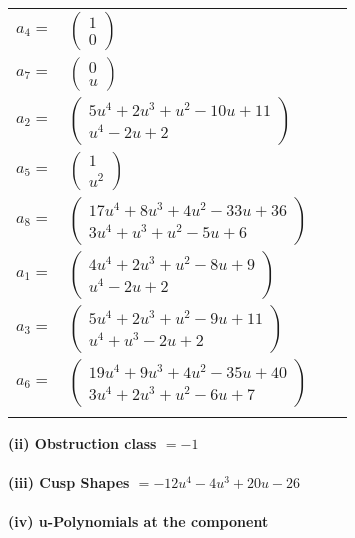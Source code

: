 \documentclass[1p]{elsarticle_modified}
\theoremstyle{definition}
\begin{document}
\begin{tabular}{m{7pt} m{180pt} m{7pt} m{180pt} }
\flushright $a_{4}=$&$\begin{pmatrix}1\\0\end{pmatrix}$ \\
\flushright $a_{7}=$&$\begin{pmatrix}0\\u\end{pmatrix}$ \\
\flushright $a_{2}=$&$\begin{pmatrix}5 u^4+2 u^3+u^2-10 u+11\\u^4-2 u+2\end{pmatrix}$ \\
\flushright $a_{5}=$&$\begin{pmatrix}1\\u^2\end{pmatrix}$ \\
\flushright $a_{8}=$&$\begin{pmatrix}17 u^4+8 u^3+4 u^2-33 u+36\\3 u^4+u^3+u^2-5 u+6\end{pmatrix}$ \\
\flushright $a_{1}=$&$\begin{pmatrix}4 u^4+2 u^3+u^2-8 u+9\\u^4-2 u+2\end{pmatrix}$ \\
\flushright $a_{3}=$&$\begin{pmatrix}5 u^4+2 u^3+u^2-9 u+11\\u^4+u^3-2 u+2\end{pmatrix}$ \\
\flushright $a_{6}=$&$\begin{pmatrix}19 u^4+9 u^3+4 u^2-35 u+40\\3 u^4+2 u^3+u^2-6 u+7\end{pmatrix}$\\&\end{tabular}
\flushleft \textbf{(ii) Obstruction class $= -1$}\\~\\
\flushleft \textbf{(iii) Cusp Shapes $= -12 u^4-4 u^3+20 u-26$}\\~\\
\newpage\renewcommand{\arraystretch}{1}
\flushleft \textbf{(iv) u-Polynomials at the component}\newline \\
\end{document}
